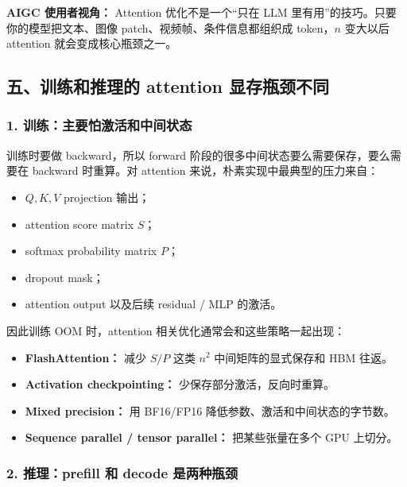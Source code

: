 \begin{summarybox}
\textbf{AIGC 使用者视角：} Attention 优化不是一个“只在 LLM 里有用”的技巧。只要你的模型把文本、图像 patch、视频帧、条件信息都组织成 token，$n$ 变大以后 attention 就会变成核心瓶颈之一。
\end{summarybox}

\subsection{五、训练和推理的 attention 显存瓶颈不同}

\subsubsection*{1. 训练：主要怕激活和中间状态}

训练时要做 backward，所以 forward 阶段的很多中间状态要么需要保存，要么需要在 backward 时重算。对 attention 来说，朴素实现中最典型的压力来自：

\begin{itemize}[leftmargin=1.5em]
  \item $Q,K,V$ projection 输出；
  \item attention score matrix $S$；
  \item softmax probability matrix $P$；
  \item dropout mask；
  \item attention output 以及后续 residual / MLP 的激活。
\end{itemize}

因此训练 OOM 时，attention 相关优化通常会和这些策略一起出现：

\begin{itemize}[leftmargin=1.5em]
  \item \textbf{FlashAttention：} 减少 $S/P$ 这类 $n^2$ 中间矩阵的显式保存和 HBM 往返。
  \item \textbf{Activation checkpointing：} 少保存部分激活，反向时重算。
  \item \textbf{Mixed precision：} 用 BF16/FP16 降低参数、激活和中间状态的字节数。
  \item \textbf{Sequence parallel / tensor parallel：} 把某些张量在多个 GPU 上切分。
\end{itemize}

\subsubsection*{2. 推理：prefill 和 decode 是两种瓶颈}

